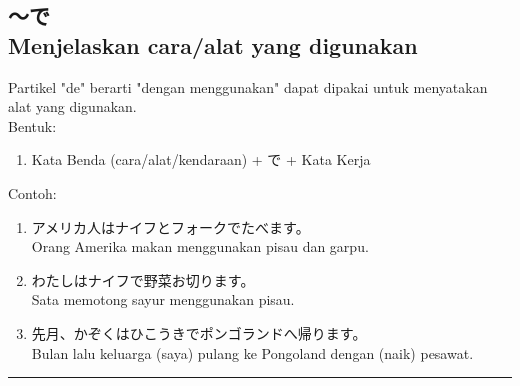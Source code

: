 \subsection*{
    ～で \\
    Menjelaskan cara/alat yang digunakan
}
Partikel "de" berarti "dengan menggunakan" dapat dipakai untuk 
menyatakan alat yang digunakan.\\
Bentuk:
\begin{enumerate}
    \item Kata Benda (cara/alat/kendaraan) + で + Kata Kerja
\end{enumerate}
Contoh: 
\begin{enumerate}
    \item アメリカ人はナイフとフォークでたべます。
    \\ Orang Amerika makan menggunakan pisau dan garpu.
    \item わたしはナイフで野菜お切ります。
    \\ Sata memotong sayur menggunakan pisau.
    \item 先月、かぞくはひこうきでポンゴランドへ帰ります。
    \\ Bulan lalu keluarga (saya) pulang ke Pongoland dengan (naik) pesawat.
\end{enumerate}

\vspace{0.2cm}\hrule height 1pt\vspace{0.2cm}


